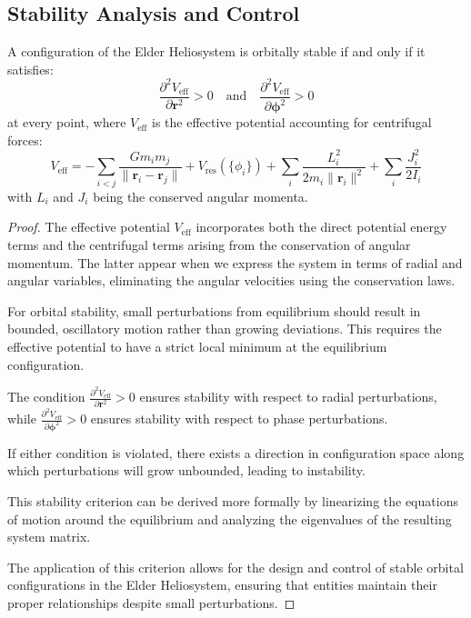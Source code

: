 \subsection{Stability Analysis and Control}

\begin{theorem}
A configuration of the Elder Heliosystem is orbitally stable if and only if it satisfies:
\begin{equation}
\frac{\partial^2 V_{\text{eff}}}{\partial \mathbf{r}^2} > 0 \quad \text{and} \quad \frac{\partial^2 V_{\text{eff}}}{\partial \boldsymbol{\phi}^2} > 0
\end{equation}
at every point, where $V_{\text{eff}}$ is the effective potential accounting for centrifugal forces:
\begin{equation}
V_{\text{eff}} = -\sum_{i < j} \frac{G m_i m_j}{\|\mathbf{r}_i - \mathbf{r}_j\|} + V_{\text{res}}(\{\phi_i\}) + \sum_i \frac{L_i^2}{2 m_i \|\mathbf{r}_i\|^2} + \sum_i \frac{J_i^2}{2 I_i}
\end{equation}
with $L_i$ and $J_i$ being the conserved angular momenta.
\end{theorem}

\begin{proof}
The effective potential $V_{\text{eff}}$ incorporates both the direct potential energy terms and the centrifugal terms arising from the conservation of angular momentum. The latter appear when we express the system in terms of radial and angular variables, eliminating the angular velocities using the conservation laws.

For orbital stability, small perturbations from equilibrium should result in bounded, oscillatory motion rather than growing deviations. This requires the effective potential to have a strict local minimum at the equilibrium configuration.

The condition $\frac{\partial^2 V_{\text{eff}}}{\partial \mathbf{r}^2} > 0$ ensures stability with respect to radial perturbations, while $\frac{\partial^2 V_{\text{eff}}}{\partial \boldsymbol{\phi}^2} > 0$ ensures stability with respect to phase perturbations.

If either condition is violated, there exists a direction in configuration space along which perturbations will grow unbounded, leading to instability.

This stability criterion can be derived more formally by linearizing the equations of motion around the equilibrium and analyzing the eigenvalues of the resulting system matrix.

The application of this criterion allows for the design and control of stable orbital configurations in the Elder Heliosystem, ensuring that entities maintain their proper relationships despite small perturbations.
\end{proof}

